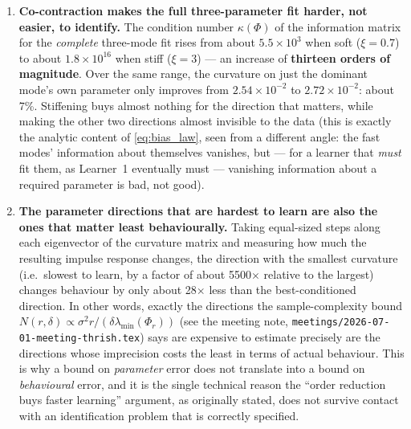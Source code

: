 \documentclass[11pt,a4paper]{article}
\begin{document}
\begin{enumerate}[nosep]
\item \textbf{Co-contraction makes the full three-parameter fit harder, not
  easier, to identify.} The condition number $\kappa(\Phi)$ of the
  information matrix for the \emph{complete} three-mode fit rises from about
  $5.5\times10^3$ when soft ($\xi=0.7$) to about $1.8\times10^{16}$ when stiff
  ($\xi=3$) --- an increase of \textbf{thirteen orders of magnitude}. Over the
  same range, the curvature on just the dominant mode's own parameter only
  improves from $2.54\times10^{-2}$ to $2.72\times10^{-2}$: about 7\%. Stiffening
  buys almost nothing for the direction that matters, while making the other
  two directions almost invisible to the data (this is exactly the analytic
  content of \eqref{eq:bias_law}, seen from a different angle: the fast modes'
  information about themselves vanishes, but --- for a learner that
  \emph{must} fit them, as Learner~1 eventually must --- vanishing information
  about a required parameter is bad, not good).

\item \textbf{The parameter directions that are hardest to learn are also the
  ones that matter least behaviourally.} Taking equal-sized steps along each
  eigenvector of the curvature matrix and measuring how much the resulting
  impulse response changes, the direction with the smallest curvature (i.e.\
  slowest to learn, by a factor of about 5500$\times$ relative to the largest)
  changes behaviour by only about 28$\times$ less than the best-conditioned
  direction. In other words, exactly the directions the sample-complexity
  bound $N(r,\delta)\propto \sigma^2 r/(\delta\lambda_{\min}(\Phi_r))$ (see the
  meeting note, \texttt{meetings/2026-07-01-meeting-thrish.tex}) says are expensive
  to estimate precisely are the directions whose imprecision costs the least
  in terms of actual behaviour. This is why a bound on \emph{parameter} error
  does not translate into a bound on \emph{behavioural} error, and it is the
  single technical reason the ``order reduction buys faster learning''
  argument, as originally stated, does not survive contact with an
  identification problem that is correctly specified.
\end{enumerate}
\end{document}
